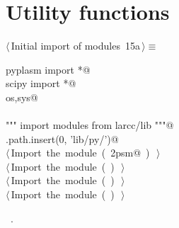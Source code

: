 \documentclass[11pt,oneside]{article}	%
\begin{document}
\appendix
\section{Utility functions}

\begin{flushleft} \small
\begin{minipage}{\linewidth} \label{scrap27}
\protect{}$\langle\,$Initial import of modules\nobreak\ {\footnotesize 15a}$\,\rangle\equiv$
\vspace{-1ex}
\begin{list}{}{} \item
\mbox{}\verb@from pyplasm import *@\\
\mbox{}\verb@from scipy import *@\\
\mbox{}\verb@import os,sys@\\
\mbox{}\verb@@\\
\mbox{}\verb@""" import modules from larcc/lib """@\\
\mbox{}\verb@sys.path.insert(0, 'lib/py/')@\\
\mbox{}\verb@@\hbox{$\langle\,$Import the module\nobreak\ ({\footnotesize {}\label{scrap28}
 }\mbox{}\verb@lar2psm@ ) {\footnotesize {}}$\,\rangle$}\verb@@\\
\mbox{}\verb@@\hbox{$\langle\,$Import the module\nobreak\ ({\footnotesize {}\label{scrap29}
 }\mbox{}\verb@simplexn@ ) {\footnotesize {}}$\,\rangle$}\verb@@\\
\mbox{}\verb@@\hbox{$\langle\,$Import the module\nobreak\ ({\footnotesize {}\label{scrap30}
 }\mbox{}\verb@larcc@ ) {\footnotesize {}}$\,\rangle$}\verb@@\\
\mbox{}\verb@@\hbox{$\langle\,$Import the module\nobreak\ ({\footnotesize {}\label{scrap31}
 }\mbox{}\verb@largrid@ ) {\footnotesize {}}$\,\rangle$}\verb@@\\
\mbox{}\verb@@{\NWsep}
\end{list}
\vspace{-1ex}
\footnotesize\addtolength{\baselineskip}{-1ex}
\begin{list}{}{\setlength{\itemsep}{-\parsep}\setlength{\itemindent}{-\leftmargin}}
\item \NWtxtMacroRefIn\ .
\end{list}
\end{minipage}\\[4ex]
\end{flushleft}
\end{document}
